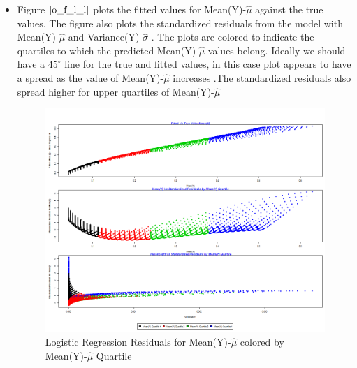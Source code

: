 \documentclass[twoside,12pt]{article}
\begin{document}
\begin{itemize}
\FloatBarrier
\item
Figure $\eqref{o_f_l_l}$ plots the fitted values for Mean(Y)-$\hat{\mu}$ against the true values. The figure also plots the standardized residuals from the model with Mean(Y)-$\hat{\mu}$  and Variance(Y)-$\hat{\sigma}$ . The plots are colored to indicate the quartiles to which the predicted Mean(Y)-$\hat{\mu}$ values belong. Ideally we should have a $45^{\circ}$ line for the true and fitted values, in this case plot appears to have a spread as the value of Mean(Y)-$\hat{\mu}$ increases .The standardized residuals also spread higher for upper quartiles of Mean(Y)-$\hat{\mu}$ 
\FloatBarrier
\begin{figure}[!htbp]
\centering
\includegraphics[scale=.50]{images/mt_rse_plot_mean_trg_slg.png} 
\caption{Logistic Regression Residuals for Mean(Y)-$\hat{\mu}$ colored by Mean(Y)-$\hat{\mu}$ Quartile}
\label{o_f_l_l}
\end{figure}


\end{itemize}


\FloatBarrier
\end{document}
